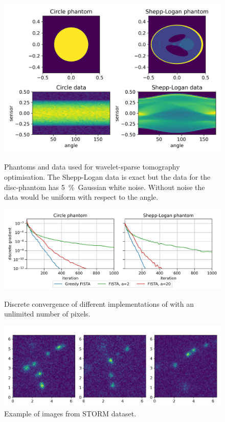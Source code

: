 \documentclass[10pt,a4paper,onecolumn]{article}
\numberwithin{equation}{section}
\begin{document}
\begin{figure}[H]\centering
	\includegraphics[width=.85\textwidth]{haar_data}
	\caption{Phantoms and data used for wavelet-sparse tomography optimisation. The Shepp-Logan data is exact but the data for the disc-phantom has \SI{5}{\percent}\ Gaussian white noise. Without noise the data would be uniform with respect to the angle.}\label{fig: haar data}

	\vspace*{\floatsep}
	
	\includegraphics[width=.85\textwidth]{haar_convergence_short}
	\caption{Discrete convergence of different implementations of  with an unlimited number of pixels.}\label{fig: haar convergence}

	\vspace*{\floatsep}

	\includegraphics[width=.85\textwidth]{STORM_data}
	\caption{Example of images from STORM dataset.}\label{fig: STORM data}
\end{figure}
\end{document}
